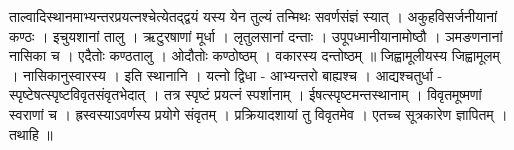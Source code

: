 ताल्वादिस्थानमाभ्यन्तरप्रयत्नश्चेत्येतद्द्वयं यस्य येन तुल्यं तन्मिथः
सवर्णसंज्ञं स्यात् । अकुहविसर्जनीयानां कण्ठः । इचुयशानां तालु ।
ऋटुरषाणां मूर्धा । लृतुलसानां दन्ताः । उपूपध्मानीयानामोष्ठौ । ञमङणनानां
नासिका च । एदैतोः कण्ठतालु । ओदौतोः कण्ठोष्ठम् । वकारस्य दन्तोष्ठम् ॥
जिह्वामूलीयस्य जिह्वामूलम् । नासिकानुस्वारस्य । इति स्थानानि । यत्नो
द्विधा - आभ्यन्तरो बाह्यश्च । आद्यश्चतुर्धा -
स्पृष्टेषत्स्पृष्टविवृतसंवृतभेदात् । तत्र स्पृष्टं प्रयत्नं स्पर्शानाम्
। ईषत्स्पृष्टमन्तस्थानाम् । विवृतमूष्मणां स्वराणां च ।
ह्रस्वस्याऽवर्णस्य प्रयोगे संवृतम् । प्रक्रियादशायां तु विवृतमेव । एतच्च
सूत्रकारेण ज्ञापितम् । तथाहि ॥
